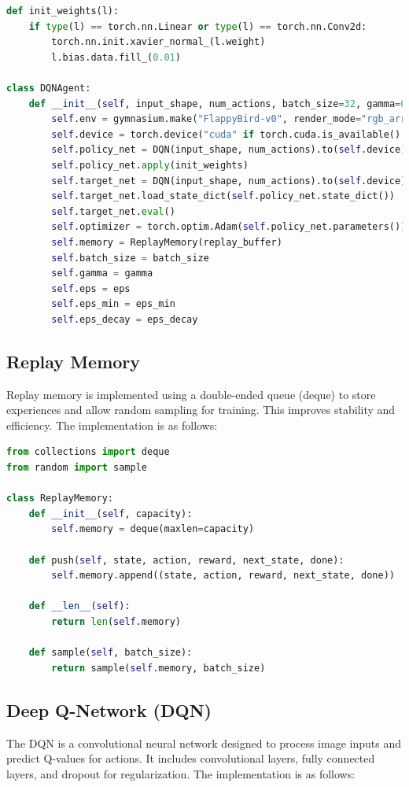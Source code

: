 \documentclass[a4paper,12pt]{article}
\begin{document}
\begin{lstlisting}[language=Python, caption=DQNAgent Implementation]
def init_weights(l):
    if type(l) == torch.nn.Linear or type(l) == torch.nn.Conv2d:
        torch.nn.init.xavier_normal_(l.weight)
        l.bias.data.fill_(0.01)

class DQNAgent:
    def __init__(self, input_shape, num_actions, batch_size=32, gamma=0.99, eps=1, eps_min=0.01, eps_decay=0.999, replay_buffer=5000):
        self.env = gymnasium.make("FlappyBird-v0", render_mode="rgb_array", use_lidar=False)
        self.device = torch.device("cuda" if torch.cuda.is_available() else "cpu")
        self.policy_net = DQN(input_shape, num_actions).to(self.device)
        self.policy_net.apply(init_weights)
        self.target_net = DQN(input_shape, num_actions).to(self.device)
        self.target_net.load_state_dict(self.policy_net.state_dict())
        self.target_net.eval()
        self.optimizer = torch.optim.Adam(self.policy_net.parameters())
        self.memory = ReplayMemory(replay_buffer)
        self.batch_size = batch_size
        self.gamma = gamma
        self.eps = eps
        self.eps_min = eps_min
        self.eps_decay = eps_decay
\end{lstlisting}

\subsection{Replay Memory}
Replay memory is implemented using a double-ended queue (deque) to store experiences and allow random sampling for training. This improves stability and efficiency. The implementation is as follows:

\begin{lstlisting}[language=Python, caption=Replay Memory]
from collections import deque
from random import sample

class ReplayMemory:
    def __init__(self, capacity):
        self.memory = deque(maxlen=capacity)

    def push(self, state, action, reward, next_state, done):
        self.memory.append((state, action, reward, next_state, done))

    def __len__(self):
        return len(self.memory)

    def sample(self, batch_size):
        return sample(self.memory, batch_size)
\end{lstlisting}

\subsection{Deep Q-Network (DQN)}
The DQN is a convolutional neural network designed to process image inputs and predict Q-values for actions. It includes convolutional layers, fully connected layers, and dropout for regularization. The implementation is as follows:
\end{document}
